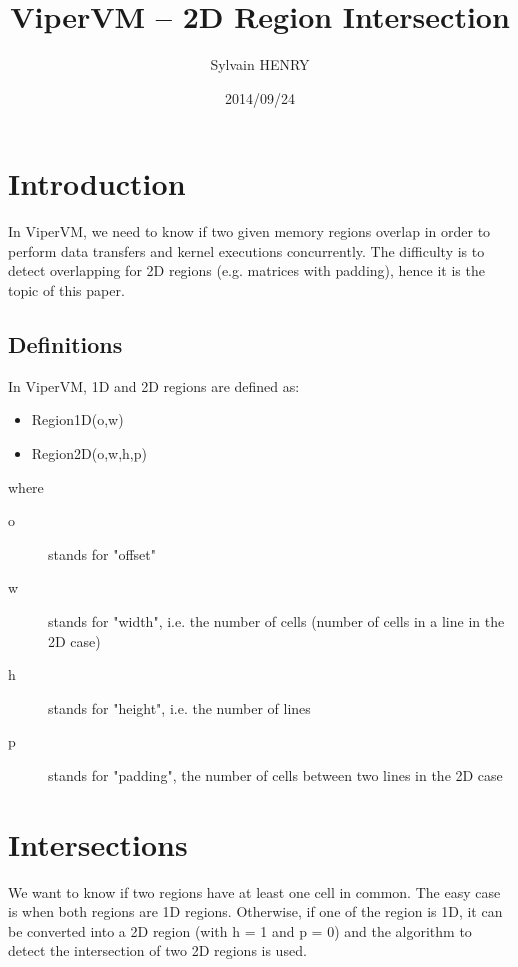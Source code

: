 \documentclass[twocolumn]{article}
\begin{document}
\title{ViperVM -- 2D Region Intersection}
\author{Sylvain HENRY}
\date{2014/09/24}


\maketitle

\section{Introduction}

In ViperVM, we need to know if two given memory regions overlap in order to
perform data transfers and kernel executions concurrently. The difficulty is to
detect overlapping for 2D regions (e.g. matrices with padding), hence it is the
topic of this paper.

\subsection{Definitions}

In ViperVM, 1D and 2D regions are defined as:
\begin{itemize}
   \item Region1D(o,w)
   \item Region2D(o,w,h,p)
\end{itemize}
where
\begin{description}
   \item[o] stands for "offset"
   \item[w] stands for "width", i.e. the number of cells (number of cells in a line in the 2D case)
   \item[h] stands for "height", i.e. the number of lines
   \item[p] stands for "padding", the number of cells between two lines in the 2D
   case
\end{description}

\section{Intersections}

We want to know if two regions have at least one cell in common. The easy case
is when both regions are 1D regions. Otherwise, if one of the region is 1D, it
can be converted into a 2D region (with h = 1 and p = 0) and the algorithm to
detect the intersection of two 2D regions is used.
\end{document}
